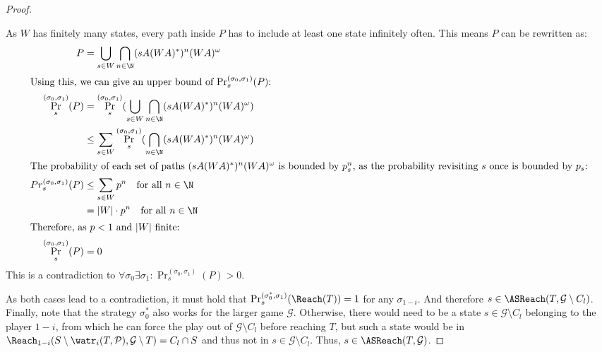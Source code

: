 \begin{proof}
\begin{description}
    As $W$ has finitely many states, every path inside $P$ has to include at least one state infinitely often. This means $P$ can be rewritten as: \begin{align*}
        P&=\bigcup_{s\in W}\bigcap_{n\in\N}(sA(WA)^\ast)^n(WA)^\omega\\
        \intertext{Using this, we can give an upper bound of $\Pr_s^{(\sigma_0, \sigma_1)}(P)$:}
        \Pr_s^{(\sigma_0, \sigma_1)}(P)&=\Pr_s^{(\sigma_0, \sigma_1)}(\bigcup_{s\in W}\bigcap_{n\in\N}(sA(WA)^\ast)^n(WA)^\omega)\\
        &\leq\sum_{s\in W}\Pr_s^{(\sigma_0, \sigma_1)}(\bigcap_{n\in\N}(sA(WA)^\ast)^n(WA)^\omega)\\
        \intertext{The probability of each set of paths $(sA(WA)^\ast)^n(WA)^\omega$ is bounded by $p_{s}^n$, as the probability revisiting $s$ once is bounded by $p_s$:}
        Pr_s^{(\sigma_0, \sigma_1)}(P)&\leq\sum_{s\in W}p^n\quad\text{for all }n\in\N\\
        &=|W|\cdot p^n\quad\text{for all }n\in\N\\
        \intertext{Therefore, as $p<1$ and $|W|$ finite:}
        \Pr_s^{(\sigma_0, \sigma_1)}(P)&=0
    \end{align*}
    This is a contradiction to $\forall\sigma_0\exists\sigma_1: \Pr_s^{(\sigma_0, \sigma_1)}(P) > 0$.
\end{description}
As both cases lead to a contradiction, it must hold that $\Pr_s^{(\sigma_0^\ast, \sigma_1)}(\Reach(T)) = 1$ for any $\sigma_{1-i}$. And therefore $s\in\ASReach(T, \mathcal{G}\setminus C_l)$. Finally, note that the strategy $\sigma_0^\ast$ also works for the larger game $\mathcal{G}$. Otherwise, there would need to be a state $s\in\mathcal{G}\setminus C_l$ belonging to the player $1-i$, from which he can force the play out of $\mathcal{G}\setminus C_l$ before reaching $T$, but such a state would be in $\Reach_{1-i}(S\setminus \watr_i(T, \mathcal{P}), \mathcal{G}\setminus T)=C_l\cap S$ and thus not in $s\in\mathcal{G}\setminus C_l$. Thus, $s\in\ASReach(T, \mathcal{G})$.


\end{proof}
